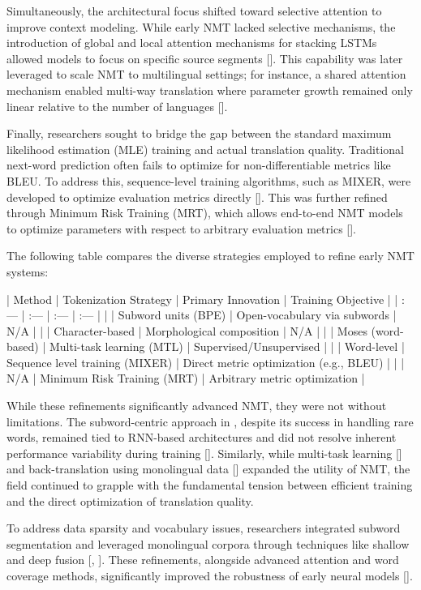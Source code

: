 \documentclass[11pt]{article}
\begin{document}
Simultaneously, the architectural focus shifted toward selective attention to improve context modeling. While early NMT lacked selective mechanisms, the introduction of global and local attention mechanisms for stacking LSTMs allowed models to focus on specific source segments [\citep{1508.04025}]. This capability was later leveraged to scale NMT to multilingual settings; for instance, a shared attention mechanism enabled multi-way translation where parameter growth remained only linear relative to the number of languages [\citep{1601.01073}].

Finally, researchers sought to bridge the gap between the standard maximum likelihood estimation (MLE) training and actual translation quality. Traditional next-word prediction often fails to optimize for non-differentiable metrics like BLEU. To address this, sequence-level training algorithms, such as MIXER, were developed to optimize evaluation metrics directly [\citep{1511.06732}]. This was further refined through Minimum Risk Training (MRT), which allows end-to-end NMT models to optimize parameters with respect to arbitrary evaluation metrics [\citep{1512.02433}].

The following table compares the diverse strategies employed to refine early NMT systems:

| Method | Tokenization Strategy | Primary Innovation | Training Objective |
| :--- | :--- | :--- | :--- |
| \citep{1508.07909} | Subword units (BPE) | Open-vocabulary via subwords | N/A |
| \citep{1511.04586} | Character-based | Morphological composition | N/A |
| \citep{1511.06114} | Moses (word-based) | Multi-task learning (MTL) | Supervised/Unsupervised |
| \citep{1511.06732} | Word-level | Sequence level training (MIXER) | Direct metric optimization (e.g., BLEU) |
| \citep{1512.02433} | N/A | Minimum Risk Training (MRT) | Arbitrary metric optimization |

While these refinements significantly advanced NMT, they were not without limitations. The subword-centric approach in \citep{1508.07909}, despite its success in handling rare words, remained tied to RNN-based architectures and did not resolve inherent performance variability during training [\citep{1508.07909}]. Similarly, while multi-task learning [\citep{1511.06114}] and back-translation using monolingual data [\citep{1511.06709}] expanded the utility of NMT, the field continued to grapple with the fundamental tension between efficient training and the direct optimization of translation quality.

To address data sparsity and vocabulary issues, researchers integrated subword segmentation and leveraged monolingual corpora through techniques like shallow and deep fusion [\citep{1503.03535}, \citep{1606.02891}]. These refinements, alongside advanced attention and word coverage methods, significantly improved the robustness of early neural models [\citep{2002.07526}].
\end{document}
